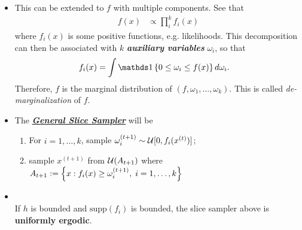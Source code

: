 \documentclass[11pt]{article}
\begin{document}
\begin{itemize}
\item This can be extended to $f$ with multiple components. See that
\begin{align*}
f(x) &\propto \prod_{i}^{k}f_{i}(x)
\end{align*} where $f_i(x)$ is some positive functions, e.g. likelihoods. This decomposition can then be associated with $k$ \emph{\textbf{auxiliary variables}} $\omega_i$, so that 
\begin{align*}
f_{i}(x)&= \int \ind{0\le \omega_i \le f(x)} d\omega_i.
\end{align*}  Therefore, $f$ is the marginal distribution of $(f, \omega_1, \ldots, \omega_k)$. This is called \emph{de-marginalization} of $f$.

\item The \underline{\emph{\textbf{General Slice Sampler}}} will be
\begin{enumerate}
\item For $i=1,\ldots,k$, sample $\omega_i^{(t+1)} \sim {\mathcal U}[0, f_{i}(x^{(t)})]$; 
\item sample $x^{(t+1)}$ from ${\mathcal U}(A_{t+1})$ where $A_{t+1} := \left\{x: f_i(x) \ge \omega_i^{(t+1)}, \;i=1,\ldots, k\right\}$
\end{enumerate}

\item \begin{lemma}\citep{robert1999monte}\\
If $h$ is bounded and $\text{supp}(f_i)$ is bounded, the slice sampler above is \textbf{uniformly ergodic}.
\end{lemma}
\end{itemize}
\end{document}
